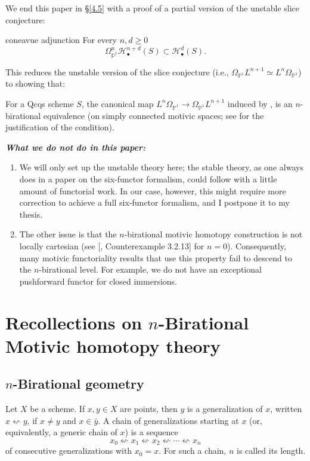We end this paper in \S\ref{4.5} with a proof of a partial version of the unstable slice conjecture:

\begin{recall*}{coneavue adjunction}
     For every $n,d\geq 0$
      $$\Omega^n _{\mathbb{p}^1}\mathcal{H}^{{n+d}}_\bullet(S) \subset\mathcal{H}^{{d}}_\bullet(S).$$
  \end{recall*}
This reduces the unstable version of the slice conjecture (i.e., $\Omega_{\mathbb{P}^1}L^{n+1}\simeq L^n\Omega_{\mathbb{P}^1}$) to showing that:
\begin{conj}
For a Qcqs scheme $S$, the canonical map $L^n\Omega_{\mathbb{P}^1}\to \Omega_{\mathbb{P}^1}L^{n+1}$ induced by , is an $n$-birational equivalence (on simply connected motivic spaces; see  for the justification of the condition).
\end{conj}



\textit{\textbf{What we do not do in this paper: }}
\begin{enumerate}
    \item {We will only set up the unstable theory here; the stable theory, as one always does in a paper on the six-functor formalism, could follow with a little amount of functorial work. In our case, however, this might require more correction to achieve a full six-functor formalism, and I postpone it to my thesis.} 
    \item The other issue is that the $n$-birational motivic homotopy construction is not locally cartesian (see [\cite{0bat}, Counterexample 3.2.13] for $n=0$). Consequently, many motivic functoriality results that use this property fail to descend to the $n$-birational level. For example, we do not have an exceptional pushforward functor for closed immersions.
\end{enumerate}
\section{Recollections on \texorpdfstring{$n$}{}-Birational Motivic homotopy theory}
\subsection{\texorpdfstring{$n$}{}-Birational geometry}
Let $X$ be a scheme. If $x,y\in X$ are points, then $y$ is a generalization of $x$, written $x\leftsquigarrow y$, if $x\neq y$ and $x\in \bar{y}$. A chain of generalizations starting at $x$ (or, equivalently, a generic chain of $x$) is a sequence $$x_0\leftsquigarrow x_1\leftsquigarrow x_2\leftsquigarrow \cdots \leftsquigarrow x_n$$ of consecutive generalizations with $x_0=x$. For such a chain, $n$ is called its length.
 
